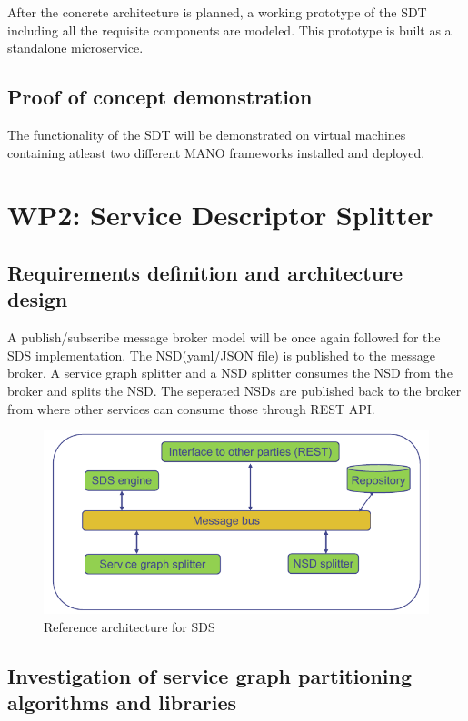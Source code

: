 After the concrete architecture is planned, a working prototype of the SDT including all the requisite components are modeled. This prototype is built as a standalone microservice.
\subsection{Proof of concept demonstration}

The functionality of the SDT will be demonstrated on virtual machines containing atleast two different MANO frameworks installed and deployed. 

\section{WP2: Service Descriptor Splitter}

\subsection{Requirements definition and architecture design}

  A publish/subscribe message broker model will be once again followed for the SDS implementation. The NSD(yaml/JSON file) is published to the message broker. A service graph splitter and a NSD splitter consumes the NSD from the broker and splits the NSD. The seperated NSDs are published back to the broker from where other services can consume those through REST API.
\begin{figure}[h]
	\centering
	\includegraphics[width=0.9\linewidth]{figures/wp2Arch}
	\caption{Reference architecture for SDS \cite{WPDescriptionsPDF}}
	\label{fig:wp2arch}
\end{figure}

\subsection{Investigation of service graph partitioning algorithms and libraries}

